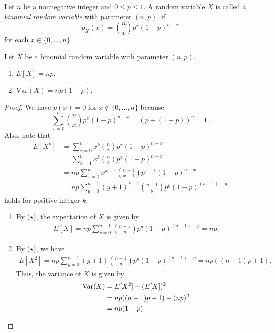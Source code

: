 \begin{definition}
  Let $n$ be a nonnegative integer and $0 \leq p \leq 1$.
  A random variable $X$ is called a \emph{binomial random variable} with
  parameter $(n, p)$, if
  \begin{equation*}
    p_X(x) = \binom{n}{x} p^x (1-p)^{n-x}
  \end{equation*}
  for each $x \in \{0, \dots, n\}$.
\end{definition}

\begin{theorem}
  Let $X$ be a binomial random variable with parameter $(n, p)$.
  \begin{enumerate}
    \item $E[X] = np$.
    \item $\mathrm{Var}(X) = np(1 - p)$.
  \end{enumerate}
\end{theorem}
\begin{proof}
  We have $p(x) = 0$ for $x \notin \{0, \dots, n\}$ because
  \begin{equation*}
    \sum_{x=0}^n \binom{n}{x} p^x (1-p)^{n-x} = (p + (1-p))^n = 1.
  \end{equation*}
  Also, note that
  \begin{align*}
    E[X^k]
    &= \sum_{x=0}^n x^k \binom{n}{x} p^x (1-p)^{n-x} \\
    &= \sum_{x=1}^n x^k \binom{n}{x} p^x (1-p)^{n-x} \\
    &= np \sum_{x=1}^n x^{k-1} \binom{n-1}{x-1} p^{x-1} (1-p)^{n-x} \\
    &= np \sum_{y=0}^{n-1} (y+1)^{k-1} \binom{n-1}{y} p^y (1-p)^{(n-1)-y}
       \tag{$\star$}
  \end{align*}
  holds for positive integer $k$.
  \begin{enumerate}
    \item By ($\star$), the expectation of $X$ is given by
      \begin{align*}
        E[X]
        = np\sum_{y=0}^{n-1} \binom{n-1}{y} p^y (1-p)^{(n-1)-y}
        = np.
      \end{align*}
    \item By ($\star$), we have
      \begin{align*}
        E[X^2]
        = np\sum_{y=0}^{n-1} (y+1)\binom{n-1}{y} p^y (1-p)^{(n-1)-y}
        = np((n-1)p+1).
      \end{align*}
      Thus, the variance of $X$ is given by
      \begin{align*}
        \mathrm{Var}(X)
        &= E[X^2] - (E[X])^2 \\
        &= np((n-1)p + 1) - (np)^2 \\
        &= np(1 - p). \qedhere
      \end{align*}
  \end{enumerate}
\end{proof}

